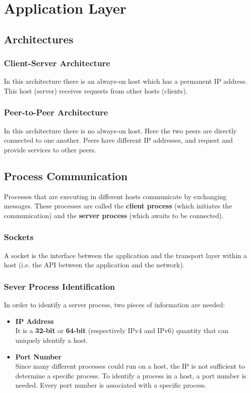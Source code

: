 \documentclass{article}
\begin{document}
\section{Application Layer}
\subsection{Architectures}
\subsubsection{Client-Server Architecture}
In this architecture there is an always-on host which has a permanent IP address. This host (server) receives requests from other hosts (clients).

\subsubsection{Peer-to-Peer Architecture}
In this architecture there is no always-on host. Here the two peers are directly connected to one another. Peers have different IP addresses, and request and provide services to other peers.

\subsection{Process Communication}
Processes that are executing in different hosts communicate by exchanging messages. These processes are called the \textbf{client process} (which initiates the communication) and the \textbf{server process} (which awaits to be connected).

\subsubsection{Sockets}
A socket is the interface between the application and the transport layer within a host (i.e. the API between the application and the network).

\subsubsection{Sever Process Identification}
In order to identify a server process, two pieces of information are needed:

\begin{itemize}
	\item \textbf{IP Address}
	\vspace{.2cm} \\
	It is a \textbf{32-bit} or \textbf{64-bit} (respectively IPv4 and IPv6) quantity that can uniquely identify a host.
	
	\item \textbf{Port Number}
	\vspace{.2cm} \\
	Since many different processes could run on a host, the IP is not sufficient to determine a specific process. To identify a process in a host, a port number is needed. Every port number is associated with a specific process.
\end{itemize}
\end{document}
